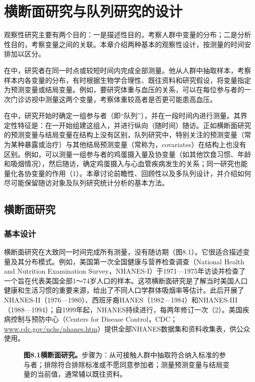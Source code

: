 \chapter{横断面研究与队列研究的设计}
观察性研究主要有两个目的：一是描述性目的，考察人群中变量的分布；二是分析性目的，考察变量之间的关联。本章介绍两种基本的观察性设计，按测量的时间安排加以区分。

在中，研究者在同一时点或较短时间内完成全部测量。他从人群中抽取样本，考察样本内各变量的分布，有时根据生物学合理性、既往资料和研究假设，将变量指定为预测变量或结局变量。例如，要研究体重与血压的关系，可以在每位参与者的一次门诊访视中测量这两个变量，考察体重较高者是否更可能患高血压。

在中，研究开始时确定一组参与者（即“队列”），并在一段时间内进行测量。其界定性特征是：在一开始组建这组人，并进行纵向（随时间）随访。正如横断面研究的预测变量与结局变量在结构上没有区别，队列研究中，特别关注的预测变量（常为某种暴露或治疗）与其他结局预测变量（常称为，covariates）在结构上也没有区别。例如，可以测量一组参与者的鸡蛋摄入量及协变量（如其他饮食习惯、年龄和吸烟情况），然后随访，确定鸡蛋摄入与心血管疾病发生的关系；同一研究也能量化各协变量的作用（1）。本章讨论前瞻性、回顾性以及多队列设计，并介绍如何尽可能保留随访对象及队列研究统计分析的基本方法。

\section{横断面研究}
\subsection{基本设计}
横断面研究在大致同一时间完成所有测量，没有随访期（图8.1）。它很适合描述变量及其分布模式。例如，美国第一次全国健康与营养检查调查（National Health and Nutrition Examination Survey，NHANES-I）于1971—1975年访谈并检查了一个旨在代表美国全部1～74岁人口的样本。这项横断面研究是了解当时美国人口健康和生活习惯的重要来源，给出了不同人口学群体吸烟率等估计。此后开展了NHANES-II（1976—1980）、西班牙裔HANES（1982—1984）和NHANES-III（1988—1994）；自1999年起，NHANES持续进行，每两年修订一次（2）。美国疾病控制与预防中心（Centers for Disease Control，CDC；\url{www.cdc.gov/nchs/nhanes.htm}）提供全部NHANES数据集和资料收集表，供公众使用。


\begin{figure}[htbp]\centering
\chEightCross
\caption*{\textbf{图8.1\quad 横断面研究。}步骤为：从可接触人群中抽取符合纳入标准的参与者；排除符合排除标准或不愿同意参加者；测量预测变量与结局变量的当前值，通常辅以既往资料。}
\end{figure}

